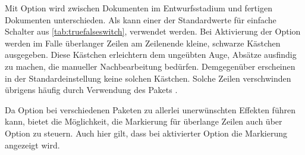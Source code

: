 \begin{Declaration}
\end{Declaration}%
Mit Option  wird zwischen Dokumenten im Entwurfsstadium und fertigen
Dokumenten unterschieden. Als  kann
einer der Standardwerte für einfache Schalter aus
\autoref{tab:truefalseswitch},  verwendet
werden. Bei Aktivierung der Option werden
im Falle überlanger Zeilen am Zeilenende kleine, schwarze Kästchen
ausgegeben. Diese Kästchen erleichtern dem ungeübten Auge, Absätze ausfindig
zu machen, die manueller Nachbearbeitung bedürfen. Demgegenüber erscheinen in
der Standardeinstellung  keine solchen
Kästchen. Solche Zeilen verschwinden übrigens häufig durch Verwendung des
Pakets
\cite{package:microtype}.

Da Option  bei verschiedenen Paketen zu allerlei unerwünschten
Effekten führen kann, bietet \KOMAScript{} die Möglichkeit, die Markierung für
überlange Zeilen auch über Option
 zu
steuern. Auch hier gilt, dass bei aktivierter Option die Markierung angezeigt
wird.
%
\EndIndexGroup
%
\EndIndexGroup

